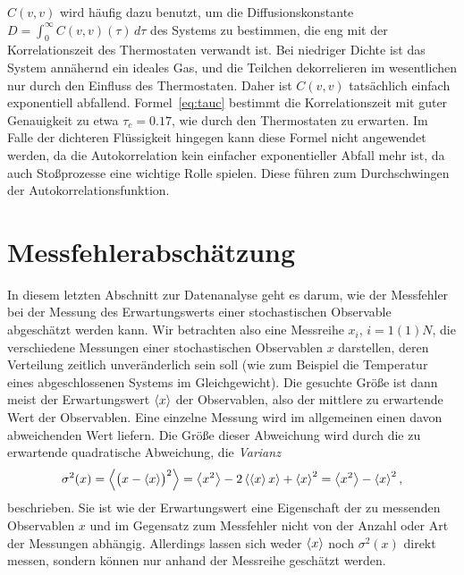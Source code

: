 $C(v,v)$ wird häufig dazu benutzt, um die Diffusionskonstante $D =
\int_0^{\infty} C(v,v)(\tau)\, d\tau$ des Systems zu bestimmen, die
eng mit der Korrelationszeit des Thermostaten verwandt ist.  Bei
niedriger Dichte ist das System annähernd ein ideales Gas, und die
Teilchen dekorrelieren im wesentlichen nur durch den Einfluss des
Thermostaten. Daher ist $C(v,v)$
tatsächlich einfach exponentiell abfallend.  Formel~\eqref{eq:tauc}
bestimmt die Korrelationszeit mit guter Genauigkeit zu etwa
$\tau_c=0.17$, wie durch den Thermostaten zu erwarten. Im Falle der
dichteren Flüssigkeit hingegen kann diese Formel nicht angewendet
werden, da die Autokorrelation kein einfacher exponentieller Abfall
mehr ist, da auch Stoßprozesse eine wichtige Rolle spielen. Diese
führen zum Durchschwingen der Autokorrelationsfunktion.

\section{Messfehlerabschätzung}

In diesem letzten Abschnitt zur Datenanalyse geht es darum, wie der
Messfehler bei der Messung des Erwartungswerts einer stochastischen
Observable abgeschätzt werden kann. Wir betrachten also eine Messreihe
$x_i$, $i=1(1)N$, die verschiedene Messungen einer stochastischen
Observablen $x$ darstellen, deren Verteilung zeitlich unveränderlich
sein soll (wie zum Beispiel die Temperatur eines abgeschlossenen
Systems im Gleichgewicht). Die gesuchte Größe ist dann meist der
Erwartungswert $\left\langle{x}\right\rangle$ der Observablen, also der mittlere zu
erwartende Wert der Observablen. Eine einzelne Messung wird im
allgemeinen einen davon abweichenden Wert liefern. Die Größe dieser
Abweichung wird durch die zu erwartende quadratische Abweichung, die
\emph{Varianz}
\begin{equation}
  \sigma^2(x) = \left\langle{\bigl(x-\left\langle{x}\right\rangle\bigr)^2}\right\rangle
  = \left\langle{x^2}\right\rangle - 2\left\langle{\left\langle{x}\right\rangle x}\right\rangle  + \left\langle{x}\right\rangle^2
  = \left\langle{x^2}\right\rangle - \left\langle{x}\right\rangle^2,
\end{equation}
beschrieben. Sie ist wie der Erwartungswert eine Eigenschaft der zu
messenden Observablen $x$ und im Gegensatz zum Messfehler nicht von
der Anzahl oder Art der Messungen abhängig. Allerdings lassen sich
weder $\left\langle{x}\right\rangle$ noch $\sigma^2(x)$ direkt messen, sondern können nur
anhand der Messreihe geschätzt werden.

